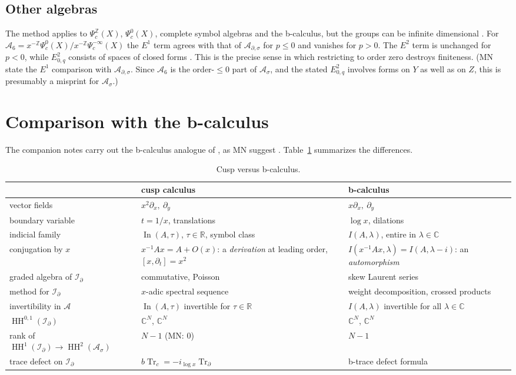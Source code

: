 \documentclass[11pt,oneside,reqno]{article}
\DeclareMathOperator{\HH}{HH}
\DeclareMathOperator{\Tr}{Tr}
\DeclareMathOperator{\In}{In}
\newcommand{\C}{\mathbb C}
\newcommand{\R}{\mathbb R}
\newcommand{\Z}{\mathbb Z}
\newcommand{\cA}{\mathcal A}
\newcommand{\Id}{\mathcal I_\partial}
\newcommand{\As}{\mathcal A_\sigma}
\newcommand{\Ads}{\mathcal A_{\partial,\sigma}}
\newcommand{\Psic}{\Psi_{c}}
\newcommand{\Trd}{\Tr_\partial}
\newcommand{\lx}{\log x}
\theoremstyle{plain}
\theoremstyle{definition}
\theoremstyle{remark}
\begin{document}
\subsection{Other algebras}\label{subsec:other}
The method applies to \(\Psic^{\Z}(X)\), \(\Psic^0(X)\), complete symbol
algebras and the b-calculus, but the groups can be infinite dimensional
\cite[\S15]{MN}. For \(\mathcal A_6=x^{-\Z}\Psic^0(X)/x^{-\Z}\Psic^{-\infty}
(X)\) the \(E^1\) term agrees with that of \(\Ads\) for \(p\le0\) and
vanishes for \(p>0\). The \(E^2\) term is unchanged for \(p<0\), while
\(E^2_{0,q}\) consists of spaces of closed forms \cite[Prop.~20]{MN}. This
is the precise sense in which restricting to order zero destroys
finiteness. (MN state the \(E^1\) comparison with \(\Ads\). Since
\(\mathcal A_6\) is the order-\(\le0\) part of \(\As\), and the stated
\(E^2_{0,q}\) involves forms on \(Y\) as well as on \(Z\), this is
presumably a misprint for \(\As\).)

\section{Comparison with the b-calculus}\label{sec:comparison}

The companion notes \cite{HHb} carry out the b-calculus analogue of
\cite{MN}, as MN suggest \cite[p.~3]{MN}. Table~\ref{tab:compare}
summarizes the differences.

\begin{table}[htbp]
\centering
\renewcommand{\arraystretch}{1.3}
\begin{tabular}{p{3.6cm}p{5.2cm}p{5.2cm}}
 & cusp calculus \cite{MN} & b-calculus \cite{HHb}\\\hline
 vector fields & \(x^2\partial_x,\ \partial_y\) & \(x\partial_x,\ \partial_y\)\\
 boundary variable & \(t=1/x\), translations & \(\log x\), dilations\\
 indicial family & \(\In(A,\tau)\), \(\tau\in\R\), symbol class & \(I(A,\lambda)\),
 entire in \(\lambda\in\C\)\\
 conjugation by \(x\) & \(x^{-1}Ax=A+O(x)\): a \emph{derivation} at leading
 order, \([x,\partial_t]=x^2\) & \(I(x^{-1}Ax,\lambda)=I(A,\lambda-i)\): an
 \emph{automorphism}\\
 graded algebra of \(\Id\) & commutative, Poisson & skew Laurent series\\
 method for \(\Id\) & \(x\)-adic spectral sequence & weight decomposition,
 crossed products\\
 invertibility in \(\cA\) & \(\In(A,\tau)\) invertible for \(\tau\in\R\) &
 \(I(A,\lambda)\) invertible for all \(\lambda\in\C\)\\
 \(\HH^{0,1}(\Id)\) & \(\C^N\), \(\C^N\) & \(\C^N\), \(\C^N\)\\
 rank of \(\HH^1(\Id)\to\HH^2(\As)\) & \(N-1\) (MN: \(0\)) & \(N-1\)\\
 trace defect on \(\Id\) & \(b\Tr_c=-i_{\lx}\Trd\) & b-trace defect
 formula\\
\end{tabular}
\caption{Cusp versus b-calculus.}
\label{tab:compare}
\end{table}
\end{document}
